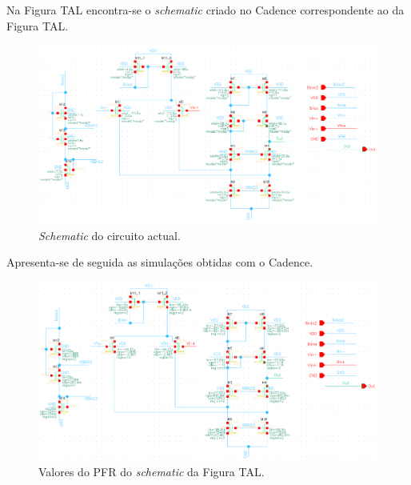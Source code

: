 \documentclass[11pt]{article}
\numberwithin{equation}{section}
\begin{document}
Na Figura TAL encontra-se o \textit{schematic} criado no Cadence correspondente ao da Figura TAL.

\begin{figure}[H]
	\centering
	\includegraphics[keepaspectratio=true, scale=0.70]{exps/dimen_final}
	\vspace{-0.5em}
	\caption{\textit{Schematic} do circuito actual.}
	\vspace{-0.8em}
\end{figure} 

Apresenta-se de seguida as simulações obtidas com o Cadence.

\begin{figure}[H]
	\centering
	\includegraphics[keepaspectratio=true, scale=0.75]{exps/PFR_final}
	\vspace{-0.5em}
	\caption{Valores do PFR do \textit{schematic} da Figura TAL.}
	\vspace{-0.8em}
\end{figure} 
\end{document}
